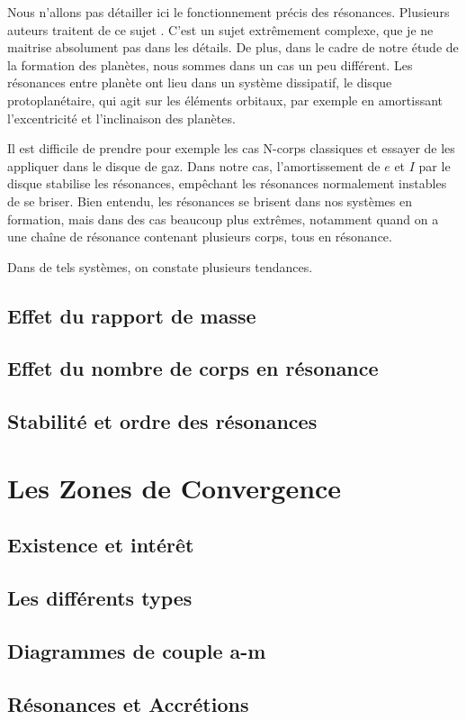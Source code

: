 Nous n'allons pas détailler ici le fonctionnement précis des résonances. Plusieurs auteurs traitent de ce sujet \citep{greenberg1977orbit, peale1986orbital, malhotra1988phd}. C'est un sujet extrêmement complexe, que je ne maitrise absolument pas dans les détails. De plus, dans le cadre de notre étude de la formation des planètes, nous sommes dans un cas un peu différent. Les résonances entre planète ont lieu dans un système dissipatif, le disque protoplanétaire, qui agit sur les éléments orbitaux, par exemple en amortissant l'excentricité et l'inclinaison des planètes.

Il est difficile de prendre pour exemple les cas N-corps classiques et essayer de les appliquer dans le disque de gaz. Dans notre cas, l'amortissement de $e$ et $I$ par le disque stabilise les résonances, empêchant les résonances normalement instables de se briser. Bien entendu, les résonances se brisent dans nos systèmes en formation, mais dans des cas beaucoup plus extrêmes, notamment quand on a une chaîne de résonance contenant plusieurs corps, tous en résonance. 

Dans de tels systèmes, on constate plusieurs tendances. 

\subsection{Effet du rapport de masse}
\subsection{Effet du nombre de corps en résonance}
 


\subsection{Stabilité et ordre des résonances}

\section{Les Zones de Convergence}
\subsection{Existence et intérêt}
\subsection{Les différents types}\label{sec:CZ-types}
\subsection{Diagrammes de couple a-m}\label{sec:migrations-maps}
\subsection{Résonances et Accrétions}
